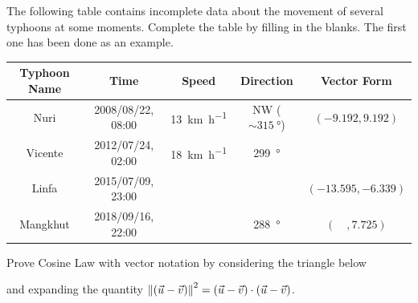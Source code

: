\begin{Exercise}
The following table contains incomplete data about the movement of several typhoons at some moments. Complete the table by filling in the blanks. The first one has been done as an example.
\begin{center}
\begin{tabular}{|c|c|c|c|c|}
\hline
Typhoon Name & Time & Speed & Direction & Vector Form\\
\hline
Nuri & 2008/08/22, 08:00 & \SI{13}{\km \per \hour} & NW ($\sim \SI{315}{\degree}$) & $(-9.192, 9.192)$\\
\hline
Vicente & 2012/07/24, 02:00 & \SI{18}{\km \per \hour} & \SI{299}{\degree} & \\
\hline
Linfa & 2015/07/09, 23:00 & & & $(-13.595, -6.339)$\\
\hline
Mangkhut & 2018/09/16, 22:00 & & \SI{288}{\degree} & $(\quad, 7.725)$\\
\hline
\end{tabular}
\end{center}
\end{Exercise}

\begin{Exercise}
Prove Cosine Law with vector notation by considering the triangle below
\begin{center}
\end{center}
and expanding the quantity $\norm{(\vec{u}-\vec{v})}^2 = (\vec{u}-\vec{v}) \cdot (\vec{u}-\vec{v})$.
\end{Exercise}

